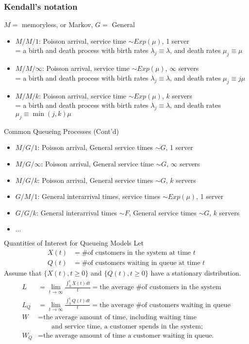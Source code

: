 \documentclass[letterpaper,handout]{beamer}
\begin{document}
\begin{frame}
	\frametitle{Kendall's notation}
	$M=$ memoryless, or Markov, $G=$ General
\begin{itemize}
\item $M/M/1$: Poisson arrival, service time $\sim Exp(\mu)$, 1 server\\
= a birth and death process with birth rates $\lambda_j\equiv \lambda$, and death rates $\mu_j\equiv \mu$
\item $M/M/\infty$: Poisson arrival, service time $\sim Exp(\mu)$, $\infty$ servers\\
= a birth and death process with birth rates $\lambda_j\equiv \lambda$, and death rates $\mu_j\equiv j\mu$
\item $M/M/k$: Poisson arrival, service time $\sim Exp(\mu)$, $k$ servers\\
= a birth and death process with birth rates $\lambda_j\equiv \lambda$, and death rates $\mu_j\equiv \min(j,k)\mu$
\end{itemize}
\end{frame}
\begin{frame}{Common Queueing Processes (Cont'd)}
\begin{itemize}
\itemsep=12pt
\item $M/G/1$: Poisson arrival, General service times $\sim G$, 1 server
\item $M/G/\infty$: Poisson arrival, General service time $\sim G$, $\infty$ servers
\item $M/G/k$: Poisson arrival, General service times $\sim G$, $k$ servers
\item $G/M/1$: General interarrival times, service times $\sim Exp(\mu)$, 1 server
\item $G/G/k$: General interarrival times $\sim F$, General service times $\sim G$, $k$ servers
\item $\ldots$
\end{itemize}
\end{frame}
\begin{frame}{Quantities of Interest for Queueing Models}
Let
\begin{align*}
X(t) &= \text{\# of customers in the system at time }t\\
Q(t) &= \text{\# of customers waiting in queue at time }t
\end{align*}
Assume that $\{X(t), t \ge 0\}$ and $\{Q(t), t \ge 0\}$ have a stationary distribution.
\begin{align*}
L&=\lim_{t\to\infty}\frac{\int_0^t X(t)dt}{t}=\text{the  average \# of customers in the system}\\
L_Q&=\lim_{t\to\infty}\frac{\int_0^t Q(t)dt}{t}=\text{the average \# of customers waiting in queue}\\
W&=\text{the average amount of time, including waiting time }\\
 &\qquad\text{and service time, a customer spends in the system;}\\
W_Q&=\text{the average amount of time a customer waiting in queue.}
\end{align*}
\end{frame}
\end{document}
